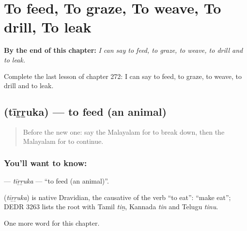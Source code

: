 
\chapter{To feed, To graze, To weave, To drill, To leak}
\label{ch:ml-to-feed-to-graze-to-weave-to-drill-to-leak}

\begin{chapteropening}
\textbf{By the end of this chapter:} \emph{I can say to feed, to graze, to weave, to drill and to leak.}

Complete the last lesson of chapter 272: I can say to feed, to graze, to weave, to drill and to leak.
\end{chapteropening}

\section[\texorpdfstring{\ml{തീറ്റുക} (tīṟṟuka)}{തീറ്റുക (tīṟṟuka)}]{ (tīṟṟuka) — to feed (an animal)}

\label{lesson:ML-C272-tirruka}



\begin{quote}
Before the new one: say the Malayalam for to break down, then the Malayalam for to continue.
\end{quote}

\subsection*{You'll want to know: }
\textbf{} — \emph{tīṟṟuka} — \textquotedblleft{}to feed (an animal)\textquotedblright{}.

\begin{cousinweb}
\textbf{} (\emph{tīṟṟuka}) is native Dravidian, the causative of the verb \textquotedblleft{}to eat\textquotedblright{}: \textquotedblleft{}make eat\textquotedblright{}; DEDR 3263 lists the root with Tamil \emph{tiṉ}, Kannada \emph{tin} and Telugu \emph{tinu}.
\end{cousinweb}

\begin{grammarlens}[title={What you've built}]
One more word for this chapter.
\end{grammarlens}

